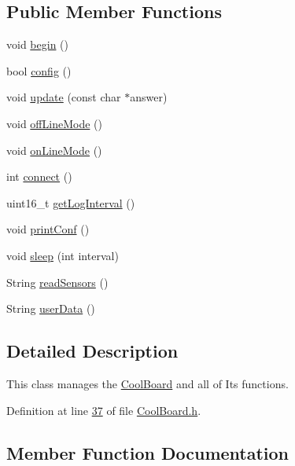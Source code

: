 \subsection*{Public Member Functions}
\begin{DoxyCompactItemize}
\item 
void \hyperlink{class_cool_board_acba7c5aef7268b2c0044bdb54d3b9d76}{begin} ()
\item 
bool \hyperlink{class_cool_board_a583a874c09c07e70a6eb9229fc4beddb}{config} ()
\item 
void \hyperlink{class_cool_board_a8612756d3f73198cdde857a66f0fe690}{update} (const char $\ast$answer)
\item 
void \hyperlink{class_cool_board_ae6b5e1274d760462290192acea4adca8}{off\+Line\+Mode} ()
\item 
void \hyperlink{class_cool_board_aa0bbc4bc605e35618d18e68795c61363}{on\+Line\+Mode} ()
\item 
int \hyperlink{class_cool_board_a519de78b807f8ec6463ff484eb925918}{connect} ()
\item 
uint16\+\_\+t \hyperlink{class_cool_board_aaa24480b273fc095a1356a589c333781}{get\+Log\+Interval} ()
\item 
void \hyperlink{class_cool_board_a486507b8f0981d3cc671ed31c2145755}{print\+Conf} ()
\item 
void \hyperlink{class_cool_board_a5d0c8ff93b615efd676be432de9f164a}{sleep} (int interval)
\item 
String \hyperlink{class_cool_board_ad03abdce2e65f520bbf2cff0f2d083cf}{read\+Sensors} ()
\item 
String \hyperlink{class_cool_board_ae7358fb6e623cfc81b775f5f1734909b}{user\+Data} ()
\end{DoxyCompactItemize}


\subsection{Detailed Description}
This class manages the \hyperlink{class_cool_board}{Cool\+Board} and all of Its functions. 

Definition at line \hyperlink{_cool_board_8h_source_l00037}{37} of file \hyperlink{_cool_board_8h_source}{Cool\+Board.\+h}.



\subsection{Member Function Documentation}
\mbox{\label{class_cool_board_acba7c5aef7268b2c0044bdb54d3b9d76}} 
